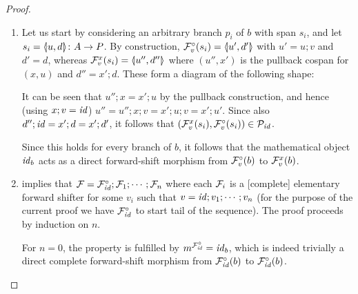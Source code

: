 \begin{proof}
\begin{enumerate}[topsep=\smallskipamount]
\item Let us start by considering an arbitrary branch $p_i$ of $b$ with span $s_i$, and let $s_i=\spanof{u}{d}\of A\to P$. By construction, $\dF v(s_i)=\spanof{u'}{d'}$ with $u'=u;v$ and $d'=d$, whereas $\rF v x(s_i)=\spanof{u''}{d''}$ where $(u'',x')$ is the pullback cospan for $(x,u)$ and $d''=x';d$. These form a diagram of the following shape:
\begin{center}
\end{center}
It can be seen that $u'';x=x';u$ by the pullback construction, and hence (using $x;v=\id$) $u''=u'';x;v=x';u;v=x';u'$. Since also $d'';\id=x';d=x';d'$, it follows that $(\rF v x(s_i),\dF v(s_i))\in \cP_\id$.

Since this holds for every branch of $b$, it follows that the mathematical object $\id_b$ acts as a direct forward-shift morphism from $\dF v(b)$ to $\rF v x(b)$.

\item {} implies that $\cF=\dF\id;\cF_1;\cdots;\cF_n$ where each $\cF_i$ is a [complete] elementary forward shifter for some $v_i$ such that $v=\id;v_1;\cdots;v_n$ (for the purpose of the current proof we have $\dF\id$ to start tail of the sequence). The proof proceeds by induction on $n$.

\smallskip For $n=0$, the property is fulfilled by $m^{\dF\id}=\id_b$, which is indeed trivially a direct complete forward-shift morphism from $\dF\id(b)$ to $\dF\id(b)$.


\end{enumerate}
\end{proof}
